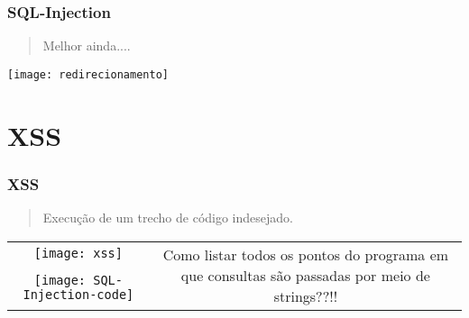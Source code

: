 \documentclass[10pt, aspectratio=169]{beamer}
\begin{document}
\begin{frame}
	\frametitle{SQL-Injection}
	
	\begin{quotation}
		\Large{Melhor ainda....}
	\end{quotation}
	\begin{center}
		
		\texttt{[image: redirecionamento]}
	\end{center}
	
	
	
	
	\vfill
	\vfill
	
\end{frame}



\section{XSS}
\begin{frame}
	\frametitle{XSS}
	
	\begin{quotation}
		Execução de um trecho de código indesejado. 
	\end{quotation}
	\begin{center}
		\begin{tabular}{c c}
			\texttt{[image: xss]} & \multirow{2}{4cm}{Como listar todos os pontos do programa em que consultas são passadas por meio de strings??!!}
			\\
			\texttt{[image: SQL-Injection-code]}
		\end{tabular}
		
	\end{center}
	
	
	
	
	\vfill
	\vfill
	
\end{frame}
\end{document}
